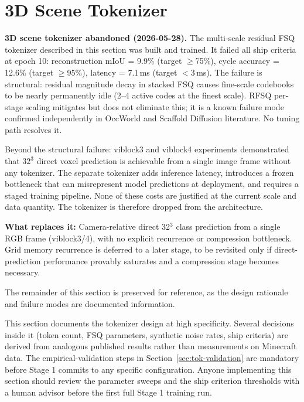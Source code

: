 \documentclass[11pt,a4paper]{article}
\begin{document}
\section{3D Scene Tokenizer}
\label{sec:tokenizer}

\begin{designdecision}
\textbf{3D scene tokenizer abandoned (2026-05-28).} The multi-scale residual FSQ tokenizer described in this section was built and trained. It failed all ship criteria at epoch 10: reconstruction mIoU = 9.9\% (target $\geq$75\%), cycle accuracy = 12.6\% (target $\geq$95\%), latency = 7.1\,ms (target $<$3\,ms). The failure is structural: residual magnitude decay in stacked FSQ causes fine-scale codebooks to be nearly permanently idle (2--4 active codes at the finest scale). RFSQ per-stage scaling mitigates but does not eliminate this; it is a known failure mode confirmed independently in OccWorld and Scaffold Diffusion literature. No tuning path resolves it.

Beyond the structural failure: viblock3 and viblock4 experiments demonstrated that $32^3$ direct voxel prediction is achievable from a single image frame without any tokenizer. The separate tokenizer adds inference latency, introduces a frozen bottleneck that can misrepresent model predictions at deployment, and requires a staged training pipeline. None of these costs are justified at the current scale and data quantity. The tokenizer is therefore dropped from the architecture.

\textbf{What replaces it:} Camera-relative direct 32$^3$ class prediction from a single RGB frame (viblock3/4), with no explicit recurrence or compression bottleneck. Grid memory recurrence is deferred to a later stage, to be revisited only if direct-prediction performance provably saturates and a compression stage becomes necessary.

The remainder of this section is preserved for reference, as the design rationale and failure modes are documented information.
\end{designdecision}

\begin{warningbox}
This section documents the tokenizer design at high specificity. Several decisions inside it (token count, FSQ parameters, synthetic noise rates, ship criteria) are derived from analogous published results rather than measurements on Minecraft data. The empirical-validation steps in Section~\ref{sec:tok-validation} are mandatory before Stage 1 commits to any specific configuration. Anyone implementing this section should review the parameter sweeps and the ship criterion thresholds with a human advisor before the first full Stage 1 training run.
\end{warningbox}
\end{document}
